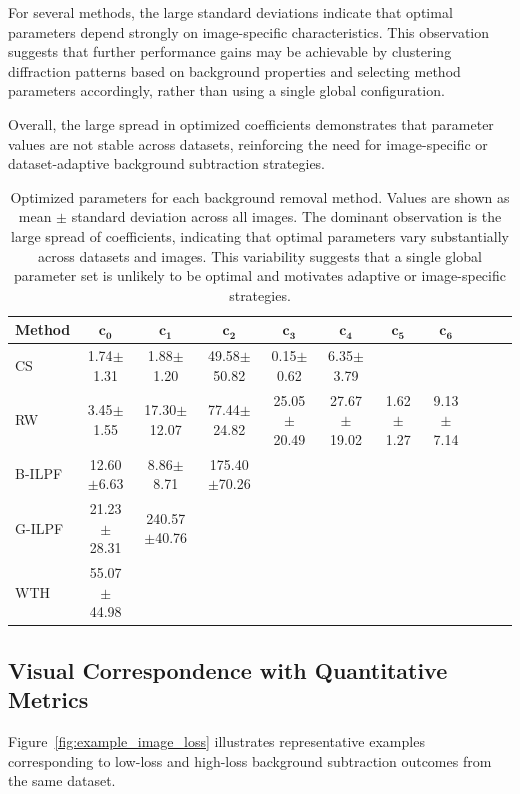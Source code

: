 \documentclass[iucr]{iucrjournals}
\begin{document}
For several methods, the large standard deviations indicate that optimal parameters depend strongly on image-specific characteristics. This observation suggests that further performance gains may be achievable by clustering diffraction patterns based on background properties and selecting method parameters accordingly, rather than using a single global configuration.

Overall, the large spread in optimized coefficients demonstrates that parameter values are not stable across datasets, reinforcing the need for image-specific or dataset-adaptive background subtraction strategies.

\begin{table}[t]
\caption{Optimized parameters for each background removal method. Values are shown as mean $\pm$ standard deviation across all images. The dominant observation is the large spread of coefficients, indicating that optimal parameters vary substantially across datasets and images. This variability suggests that a single global parameter set is unlikely to be optimal and motivates adaptive or image-specific strategies.}
\label{tab:optimized_params}
\centering
\small
\setlength{\tabcolsep}{3pt}
\renewcommand{\arraystretch}{1.1}
\begin{tabular}{@{}lcccccccccc@{}}
\toprule
\textbf{Method} & $\mathbf{c_0}$ & $\mathbf{c_1}$ & $\mathbf{c_2}$ & $\mathbf{c_3}$ & $\mathbf{c_4}$ & $\mathbf{c_5}$ & $\mathbf{c_6}$ \\ \midrule
CS     & 1.74$\pm$1.31 & 1.88$\pm$1.20 & 49.58$\pm$50.82 & 0.15$\pm$0.62 & 6.35$\pm$3.79 &  &  \\
RW     & 3.45$\pm$1.55 & 17.30$\pm$12.07 & 77.44$\pm$24.82 & 25.05$\pm$20.49 & 27.67$\pm$19.02 & 1.62$\pm$1.27 & 9.13$\pm$7.14 \\
B-ILPF & 12.60$\pm$6.63 & 8.86$\pm$8.71 & 175.40$\pm$70.26 &  &  &  &  \\
G-ILPF & 21.23$\pm$28.31 & 240.57$\pm$40.76 &  &  &  &  &  \\
WTH    & 55.07$\pm$44.98 &  &  &  &  &  &  \\
\bottomrule
\end{tabular}
\end{table}

\subsection{Visual Correspondence with Quantitative Metrics}

Figure~\ref{fig:example_image_loss} illustrates representative examples corresponding to low-loss and high-loss background subtraction outcomes from the same dataset. 
\end{document}
